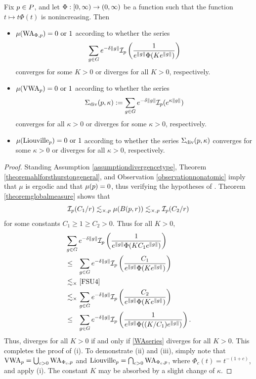 \begin{theorem}
\label{theoremFSUkhinchin}
Fix $p\in P$, and let $\Phi:{[0,\infty)}\to(0,\infty)$ be a function such that the function $t\mapsto t\Phi(t)$ is nonincreasing. Then
\begin{itemize}
\item[(i)] $\mu(\mathrm{WA}_{\Phi,p}) = 0\textup{ or }1$ according to whether the series
\begin{equation}
\label{WAseries}
\sum_{g\in G} e^{-\delta \|g\|} \mathcal I_p\left(\frac{1}{e^{\|g\|} \Phi(K e^{\|g\|})}\right)
\end{equation}
converges for some $K > 0$ or diverges for all $K > 0$, respectively.
\item[(ii)] $\mu(\mathrm{VWA}_p) = 0\textup{ or }1$ according to whether the series
\begin{equation}
\label{VWAseries}
\Sigma_{\textup{div}}(p,\kappa) := \sum_{g\in G} e^{-\delta \|g\|} \mathcal I_p(e^{\kappa\|g\|})
\end{equation}
converges for all $\kappa > 0$ or diverges for some $\kappa > 0$, respectively.
\item[(iii)] $\mu(\mathrm{Liouville}_p) = 0\textup{ or }1$ according to whether the series $\Sigma_{\textup{div}}(p,\kappa)$ converges for some $\kappa > 0$ or diverges for all $\kappa > 0$, respectively.
\end{itemize}
\end{theorem}
\begin{proof}
Standing Assumption \ref{assumptiondivergencetype}, Theorem \ref{theoremahlforsthurstongeneral}, and Observation \ref{observationnonatomic} imply that $\mu$ is ergodic and that $\mu(p) = 0$, thus verifying the hypotheses of \cite[Theorem 8.1]{FSU4}. Theorem \ref{theoremglobalmeasure} shows that
\[
\mathcal I_p(C_1/r) \lesssim_{\times,p} \mu(B(p,r)) \lesssim_{\times,p} \mathcal I_p(C_2/r)
\]
for some constants $C_1 \geq 1 \geq C_2 > 0$. Thus for all $K > 0$,
\begin{align*}
&\sum_{g\in G} e^{-\delta\dogo g} \II_\bp\left(\frac{1}{e^{\dogo g} \Phi(K C_1 e^{\dogo g})}\right)\\
&\leq_\pt \sum_{g\in G} e^{-\delta\dogo g} \II_\bp\left(\frac{C_1}{e^{\dogo g} \Phi(K e^{\dogo g})}\right)\\
&\lesssim_\times \text{\cite[(8.1)]{FSU4}}\\
&\lesssim_\times \sum_{g\in G} e^{-\delta\dogo g} \II_\bp\left(\frac{C_2}{e^{\dogo g} \Phi(K e^{\dogo g})}\right)\\
&\leq_\pt \sum_{g\in G} e^{-\delta\dogo g} \II_\bp\left(\frac{1}{e^{\dogo g} \Phi((K/C_1) e^{\dogo g})}\right).
\end{align*}
Thus, \cite[(8.1)]{FSU4} diverges for all $K > 0$ if and only if \eqref{WAseries} diverges for all $K > 0$. This completes the proof of (i). To demonstrate (ii) and (iii), simply note that $\mathrm{VWA}_p = \bigcup_{c > 0} \mathrm{WA}_{\Phi_c,p}$ and $\mathrm{Liouville}_p = \bigcap_{c > 0} \mathrm{WA}_{\Phi_c,p}$, where $\Phi_c(t) = t^{-(1 + c)}$, and apply (i). The constant $K$ may be absorbed by a slight change of $\kappa$.
\end{proof}

